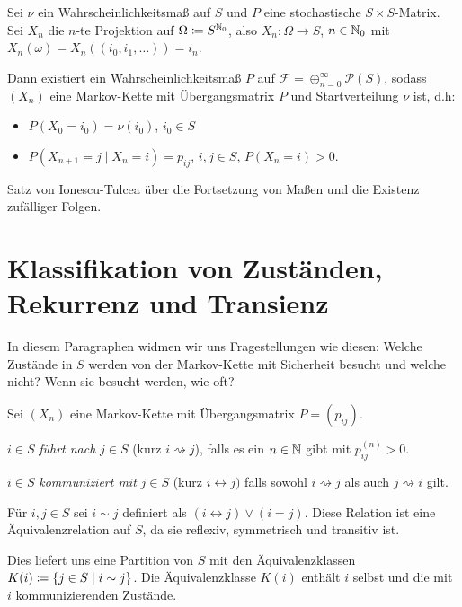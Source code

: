\documentclass[a4paper,twoside,DIV15,BCOR12mm]{scrbook}
\newcommand{\cF}{\mathcal F}
\begin{document}
\begin{satz}
Sei $\nu$ ein Wahrscheinlichkeitsmaß auf $S$ und $P$ eine stochastische $S\times S$-Matrix. Sei $X_n$ die $n$-te Projektion auf $\Omega \da S^{\MdN_0}$, also $X_n : \Omega\to S$, $n\in\mathbb{N}_0$ mit $X_n(\omega) = X_n( (i_0,i_1,\ldots) ) = i_n$.

Dann existiert ein Wahrscheinlichkeitsmaß $P$ auf $\cF = \oplus_{n=0}^\infty \mathcal P (S)$, sodass $(X_n)$ eine Markov-Kette mit Übergangsmatrix $P$ und Startverteilung $\nu$ ist, d.h:
\begin{itemize}
\item $P(X_0 = i_0)= \nu(i_0)$, $i_0\in S$
\item $P(X_{n+1} = j \mid X_n= i) = p_{ij}$, $i,j\in S$, $P(X_n=i)>0$.
\end{itemize}
\end{satz}

\begin{beweis}
Satz von Ionescu-Tulcea über die Fortsetzung von Maßen und die Existenz zufälliger Folgen.
\end{beweis}

\section{Klassifikation von Zuständen, Rekurrenz und Transienz}

In diesem Paragraphen widmen wir uns Fragestellungen wie diesen:
Welche Zustände in $S$ werden von der Markov-Kette mit Sicherheit besucht und welche nicht? Wenn sie besucht werden, wie oft? 

\begin{definition}
Sei $(X_n)$ eine Markov-Kette mit Übergangsmatrix $P=(p_{ij})$.
\begin{enuma}
\item $i\in S$ \emph{führt nach} $j\in S$ (kurz $i\rightsquigarrow j$)\index{$\rightsquigarrow$}, falls es ein $n\in \mathbb{N}$ gibt mit $p_{ij}^{(n)}>0$.

\item $i\in S$ \emph{kommuniziert mit} $j\in S$ (kurz $i\leftrightarrow j)$\index{$\leftrightarrow$} falls sowohl $i\rightsquigarrow j$ als auch $j\rightsquigarrow i$ gilt.
\end{enuma}
\end{definition}

\begin{bemerkung}
Für $i,j\in S$ sei $i\sim j$ definiert als $(i\leftrightarrow j) \vee (i=j)$. Diese Relation ist eine Äquivalenzrelation auf $S$, da sie reflexiv, symmetrisch und transitiv ist.

Dies liefert uns eine Partition von $S$ mit den Äquivalenzklassen $K(i) \da \{j\in S \mid i\sim j\}$. Die Äquivalenzklasse $K(i)$ enthält $i$ selbst und die mit $i$ kommunizierenden Zustände.
\end{bemerkung}
\end{document}
